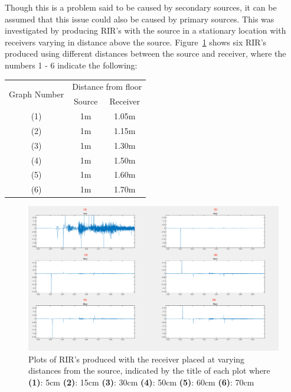 \documentclass[../../main.tex]{subfiles}
\begin{document}
			 Though this is a problem said to be caused by secondary sources, it can be assumed that this issue could also be caused by primary sources. This was investigated by producing \ac{RIR}'s with the source in a stationary location with receivers varying in distance above the source. Figure~\ref{HeightTest} shows six \ac{RIR}'s produced using different distances between the source and receiver, where the numbers 1 - 6 indicate the following:

			 \begin{center}
				 \begin{tabular}{|c |c| c|}
				 \hline
				 \multirow{2}{*}{Graph Number} & \multicolumn{2}{|c|}{Distance from floor} \\ \cline{2-3}
				 & Source & Receiver \\\hline
				 (1) & 1m & 1.05m \\
				 (2) & 1m & 1.15m \\
				 (3) & 1m & 1.30m \\
				 (4) & 1m & 1.50m \\
				 (5) & 1m & 1.60m \\
				 (6) & 1m & 1.70m \\ \hline
				 \end{tabular}
			 \end{center}
			 \vspace{5mm}
			\begin{figure}[h]
				\centerline{\includegraphics[width=\textwidth]{Sections/Implementation/Odeon/images/incorrectRIR/HeightTest_Edit.png}}
				\caption{Plots of \ac{RIR}'s produced with the receiver placed at varying distances from the source, indicated by the title of each plot where \textbf{(1)}: 5cm \textbf{(2)}: 15cm \textbf{(3)}: 30cm \textbf{(4)}: 50cm \textbf{(5)}: 60cm \textbf{(6)}: 70cm}
				\label{HeightTest}
			\end{figure}
\end{document}
